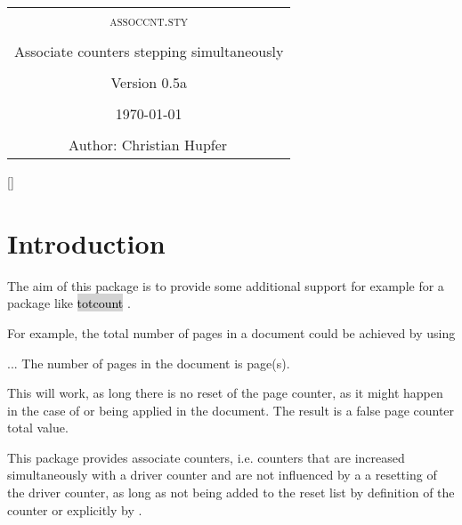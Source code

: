 \documentclass[12pt,paper=a4]{ltxdoc}
\newcommand{\MarkupPackageName}[2][lightgray]{%
\colorbox{#1}{\textcolor{black}{#2}}%
}%
\def\packageversion{0.5a}%
\newcommand{\PackageDocName}{assoccnt.sty}%
\begin{document}
\mmddyyyydate


\setlength{\parindent}{0pt}

\thispagestyle{empty}%

\begin{center}
\begin{tcolorbox}[colback=yellow!30!white,width=0.8\textwidth]
\large \bfseries%
\begin{center}%
\begin{tabular}{c}%
\textsc{\PackageDocName} \tabularnewline
\tabularnewline
Associate counters stepping simultaneously \tabularnewline
\tabularnewline
Version \packageversion \tabularnewline
\tabularnewline
\today \tabularnewline
\tabularnewline
\addtocounter{footnote}{2}
Author: Christian Hupfer\(^\mathrm{\fnsymbol{footnote}}\)%
\tabularnewline
\end{tabular}
\end{center}
\end{tcolorbox}
\makeatletter
\renewcommand{\thefootnote}{\fnsymbol{footnote}}%
%
\makeatother

\end{center}

\tableofcontents
\clearpage




\pagestyle{scrheadings}%
\setheadsepline{2pt}[\color{blue}]

\setcounter{footnote}{0}


\section{Introduction}

The aim of this package is to provide some additional support for example for a package like \MarkupPackageName{totcount}. 

For example, the total number of pages in a document could be achieved by using

\begin{dispExample}%
...
The number of pages in the document is \number{} page(s). 
\end{dispExample}%

This will work, as long there is no reset of the page counter, as it might happen in the case of  or   being applied in the document. The result is a false page counter total value. 

This package provides associate counters, i.e. counters that are increased simultaneously with a driver counter and are not influenced by a a resetting of the driver counter, as long as not being added to the reset list by definition of the counter or explicitly by . 
\end{document}
